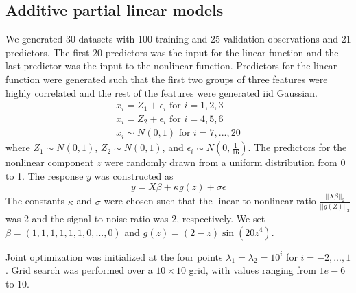 \documentclass[10pt,letterpaper]{article}
\begin{document}
\subsection{Additive partial linear models}

We generated 30 datasets with 100 training and 25 validation observations and 21 predictors. The first 20 predictors was the input for the linear function and the last predictor was the input to the nonlinear function. Predictors for the linear function were generated such that the first two groups of three features were highly correlated and the rest of the features were generated iid Gaussian.
\begin{equation}
\begin{array}{c}
x_i = Z_1 + \epsilon_i \text{ for } i=1, 2, 3 \\
x_i = Z_2 + \epsilon_i \text{ for } i= 4, 5, 6 \\
x_i \sim N(0,1) \text{ for } i = 7, ..., 20
\end{array}
\end{equation}
where $Z_1 \sim N(0,1)$, $Z_2 \sim N(0,1)$, and $\epsilon_i \sim N(0, \frac{1}{16})$. The predictors for the nonlinear component $z$ were randomly drawn from a uniform distribution from 0 to 1. The response $y$ was constructed as
\begin{equation}
y = X\beta + \kappa g(z) + \sigma \epsilon
\end{equation}
The constants $\kappa$ and $\sigma$ were chosen such that the linear to nonlinear ratio $\frac{||X\beta||_2}{||g(Z)||_2}$ was 2 and the signal to noise ratio was 2, respectively. We set $\beta = (1, 1, 1, 1, 1, 1, 0, ..., 0)$ and $g(z) =(2-z)\sin(20z^4)$.

Joint optimization was initialized at the four points $\lambda_1 = \lambda_2 = 10^i$ for $i=-2, ..., 1$. Grid search was performed over a $10 \times 10$ grid, with values ranging from $1e-6$ to $10$.
\end{document}
